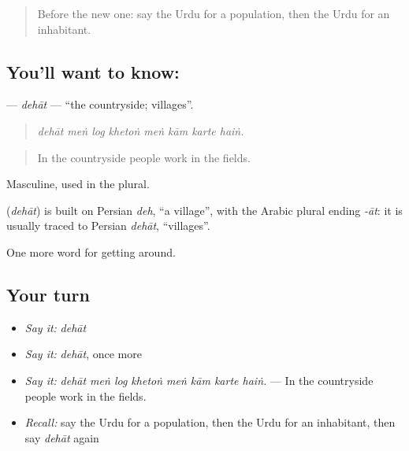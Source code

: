 \begin{quote}
Before the new one: say the Urdu for a population, then the Urdu for an inhabitant.
\end{quote}

\subsection*{You'll want to know: }
\textbf{} — \emph{dehāt} — \textquotedblleft{}the countryside; villages\textquotedblright{}.

\begin{quote}
       
\end{quote}

\begin{quote}
\emph{dehāt meṅ log khetoṅ meṅ kām karte haiṅ.}
\end{quote}

\begin{quote}
In the countryside people work in the fields.
\end{quote}

Masculine, used in the plural.

\begin{cousinweb}
\textbf{} (\emph{dehāt}) is built on Persian \emph{deh}, \textquotedblleft{}a village\textquotedblright{}, with the Arabic plural ending \emph{-āt}: it is usually traced to Persian \emph{dehāt}, \textquotedblleft{}villages\textquotedblright{}.
\end{cousinweb}

\begin{grammarlens}[title={What you've built}]
One more word for getting around.
\end{grammarlens}

\subsection*{Your turn}
\begin{itemize}
\raggedright
  \item \emph{Say it:} \emph{dehāt}
  \item \emph{Say it:} \emph{dehāt}, once more
  \item \emph{Say it:} \emph{dehāt meṅ log khetoṅ meṅ kām karte haiṅ.} — In the countryside people work in the fields.
  \item \emph{Recall:} say the Urdu for a population, then the Urdu for an inhabitant, then say \emph{dehāt} again
\end{itemize}

